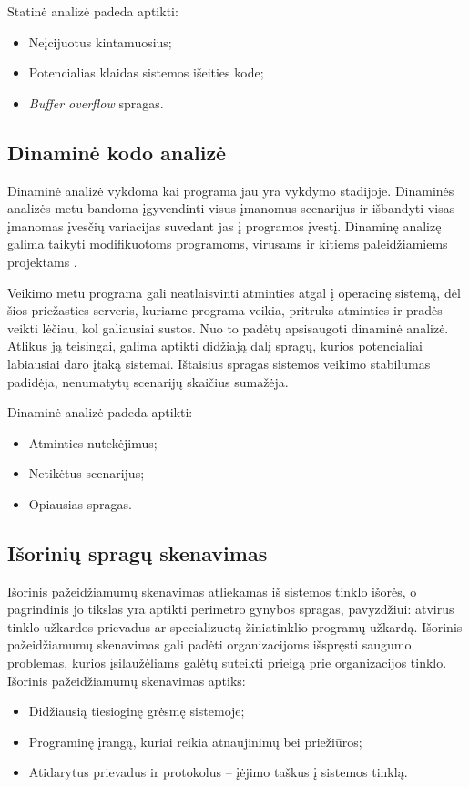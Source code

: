 \documentclass[a4paper,12pt,fleqn]{article}
\begin{document}
Statinė analizė padeda aptikti:
\begin{itemize}
	\item Neįcijuotus kintamuosius;
	\item Potencialias klaidas sistemos išeities kode;
	\item \textit{Buf{}fer overflow} spragas.
\end{itemize}



\subsection{Dinaminė kodo analizė}
\label{sec:example}


\label{sec:data}
Dinaminė analizė vykdoma kai programa jau yra vykdymo stadijoje. Dinaminės analizės metu bandoma įgyvendinti visus įmanomus scenarijus ir išbandyti visas įmanomas įvesčių variacijas suvedant jas į programos įvestį. Dinaminę analizę galima taikyti modifikuotoms programoms, virusams ir kitiems paleidžiamiems projektams \cite{bayer2006dynamic}.

Veikimo metu programa gali neatlaisvinti atminties atgal į operacinę sistemą, dėl šios priežasties serveris, kuriame programa veikia, pritruks atminties ir pradės veikti lėčiau, kol galiausiai sustos. Nuo to padėtų apsisaugoti dinaminė analizė. Atlikus ją teisingai, galima aptikti didžiają dalį spragų, kurios potencialiai labiausiai daro įtaką sistemai. Ištaisius spragas sistemos veikimo stabilumas padidėja, nenumatytų scenarijų skaičius sumažėja.

Dinaminė analizė padeda aptikti:
\begin{itemize}
	\item Atminties nutekėjimus;
	\item Netikėtus scenarijus;
	\item Opiausias spragas.
\end{itemize}

\subsection{Išorinių spragų skenavimas}
\label{sec:example}

Išorinis pažeidžiamumų skenavimas atliekamas iš sistemos tinklo išorės, o pagrindinis jo tikslas yra aptikti perimetro gynybos spragas, pavyzdžiui: atvirus tinklo užkardos prievadus ar specializuotą žiniatinklio programų užkardą\cite{gula1999passive}. Išorinis pažeidžiamumų skenavimas gali padėti organizacijoms išspręsti saugumo problemas, kurios įsilaužėliams galėtų suteikti prieigą prie organizacijos tinklo.
\newline
Išorinis pažeidžiamumų skenavimas aptiks:
\begin{itemize}
	\item Didžiausią tiesioginę grėsmę sistemoje;
	\item Programinę įrangą, kuriai reikia atnaujinimų bei priežiūros;
	\item Atidarytus prievadus ir protokolus – įėjimo taškus į sistemos tinklą.
\end{itemize}
\end{document}
